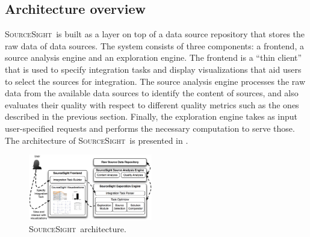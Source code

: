 \documentclass{vldb}
\newcommand\system{\textsc{SourceSight}}
\begin{document}
\subsection{Architecture overview}
\system~is built as a layer on top of a data source repository that stores the raw data of data sources. The system consists of three components: a frontend, a source analysis engine and an exploration engine. The frontend is a ``thin client'' that is used to specify integration tasks and display visualizations that aid users to select the sources for integration. The source analysis engine processes the raw data from the available data sources to identify the content of sources, and also evaluates their quality with respect to different quality metrics such as the ones described in the previous section. Finally, the exploration engine takes as input user-specified requests and performs the necessary computation to serve those. The architecture of \system~is presented in . 

\begin{figure}[h]
    \centering
    \includegraphics[width=0.48\textwidth]{fig/srcsightOver}
    	\vspace{-20pt}
    \caption{\system~architecture.}
    \label{fig:architecture}
    	\vspace{-10pt}
\end{figure}
\end{document}
